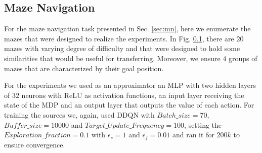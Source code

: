 \documentclass{article}
\begin{document}
\subsection{Maze Navigation}


For the maze navigation task presented in Sec. \ref{sec:mn}, here we enumerate the mazes that were designed to realize the experiments. In Fig. \ref{}, there are $20$ mazes with varying degree of difficulty and that were designed to hold some similarities that would be useful for transferring. Moreover, we ensure $4$ groups of mazes that are characterized by their goal position. 

For the experiments we used as an approximator an MLP with two hidden layers of $32$ neurons with ReLU as activation functions, an input layer receiving the state of the MDP and an output layer that outputs the value of each action. For training the sources we, again, used DDQN with $Batch\_size = 70$, $Buffer\_size = 10000$ and $Target\_Update\_Frequency = 100$, setting the $Exploration\_fraction = 0.1$ with $\epsilon_s=1$ and $\epsilon_f=0.01$ and ran it for $200k$ to ensure convergence.


\end{document}
